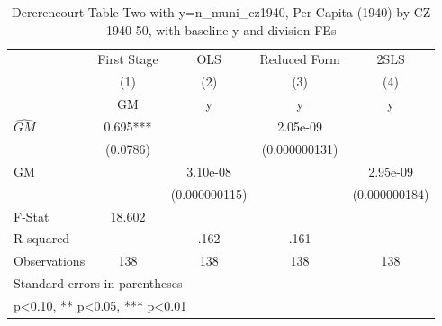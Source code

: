 \begin{table}[htbp]\centering
\def\sym#1{\ifmmode^{#1}\else\(^{#1}\)\fi}
\caption{Dererencourt Table Two with y=n\_muni\_cz1940, Per Capita (1940) by CZ 1940-50, with baseline y and division FEs}
\begin{tabular}{l*{4}{c}}
\toprule
                    & First Stage   &         OLS   &Reduced Form   &        2SLS   \\
                    &\multicolumn{1}{c}{(1)}&\multicolumn{1}{c}{(2)}&\multicolumn{1}{c}{(3)}&\multicolumn{1}{c}{(4)}\\
                    &\multicolumn{1}{c}{GM}&\multicolumn{1}{c}{y}&\multicolumn{1}{c}{y}&\multicolumn{1}{c}{y}\\
\midrule
$\hat{GM}$          &       0.695***&               &    2.05e-09   &               \\
                    &    (0.0786)   &               &(0.000000131)   &               \\
\addlinespace
GM                  &               &    3.10e-08   &               &    2.95e-09   \\
                    &               &(0.000000115)   &               &(0.000000184)   \\
\midrule
F-Stat              &      18.602   &               &               &               \\
R-squared           &               &        .162   &        .161   &               \\
Observations        &         138   &         138   &         138   &         138   \\
\bottomrule
\multicolumn{5}{l}{\footnotesize Standard errors in parentheses}\\
\multicolumn{5}{l}{\footnotesize * p<0.10, ** p<0.05, *** p<0.01}\\
\end{tabular}
\end{table}
